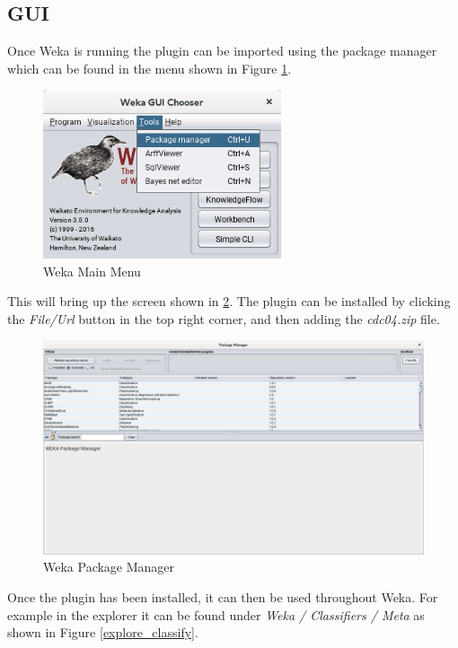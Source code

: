 \subsection{GUI}

Once Weka is running the plugin can be imported using the package manager which can be found in the menu shown in Figure \ref{main}.
\begin{figure}[ht!]
\centering
\includegraphics[width=70mm]{images/weka_main_screen.png}
\caption{Weka Main Menu \label{main}}
\end{figure}

This will bring up the screen shown in \ref{package_man}. The plugin can be installed by clicking the \textit{File/Url} button in the top right corner, and then adding the \textit{cdc04.zip} file.

\begin{figure}[ht!]
\centering
\includegraphics[width=160mm]{images/package_manager.png}
\caption{Weka Package Manager \label{package_man}}
\end{figure}

Once the plugin has been installed, it can then be used throughout Weka. For example in the explorer it can be found under \textit{Weka / Classifiers / Meta} as shown in Figure \ref{explore_classify}.

